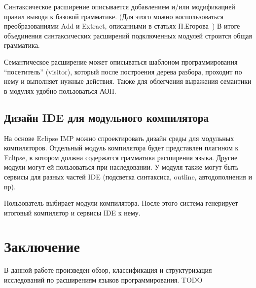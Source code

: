 \documentclass[a4paper,12pt,titlepage]{extarticle}
\begin{document}
Синтаксическое расширение описывается добавлением и/или модификацией правил
вывода к базовой грамматике. (Для этого можно воспользоваться преобразованиями
Add и Extract, описанными в статьях П.Егорова~\cite{Egor}) В итоге объединения
синтаксических расширений подключенных модулей строится общая грамматика.

Семантическое расширение может описываться шаблоном программирования
``посетитель'' (visitor), который после построения дерева разбора, проходит по
нему и выполняет нужные действия. Также для облегчения выражения семантики в
модулях удобно пользоваться АОП.

\subsection{Дизайн IDE для модульного компилятора}

На основе Eclipse IMP можно спроектировать дизайн среды для модульных
компиляторов.
Отдельный модуль компилятора будет представлен плагином к Eclipse, в котором
должна содержатся грамматика расширения языка. Другие модули могут ей
пользоваться при наследовании. У модуля также могут быть сервисы для разных
частей IDE (подсветка синтаксиса, outline, автодополнения и пр).

Пользователь выбирает модули компилятора. После этого система генерирует
итоговый компилятор и сервисы IDE к нему.

\section{Заключение}

В данной работе произведен обзор, классификация и структуризация исследований
по расширениям языков программирования.
TODO

\small



\end{document}
